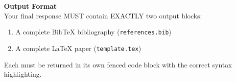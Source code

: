 \vspace{1em}
\noindent\textbf{Output Format}\\
\vspace{0.5em}
Your final response MUST contain EXACTLY two output blocks:
\begin{enumerate}
    \item A complete BibTeX bibliography (\texttt{references.bib})
    \item A complete LaTeX paper (\texttt{template.tex})
\end{enumerate}
Each must be returned in its own fenced code block with the correct syntax highlighting.